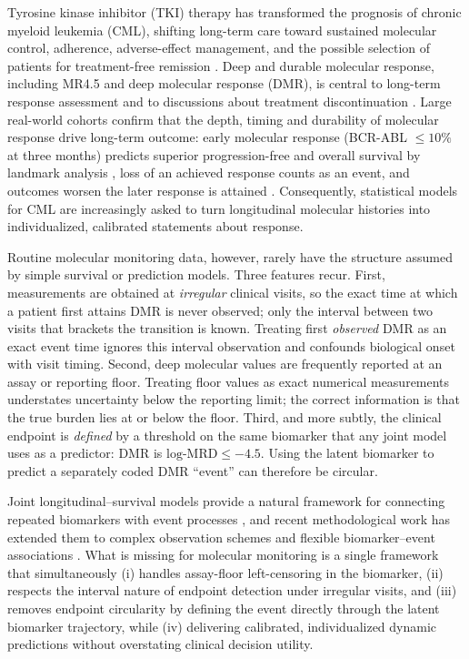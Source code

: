 \documentclass[11pt]{article}
\begin{document}
Tyrosine kinase inhibitor (TKI) therapy has transformed the prognosis of
chronic myeloid leukemia (CML), shifting long-term care toward sustained
molecular control, adherence, adverse-effect management, and the possible
selection of patients for treatment-free remission
\cite{Hochhaus2020ELN,Jabbour2025JAMAReview,Haddad2026Algorithms,Senapati2023CMLManagement}.
Deep and durable molecular response, including MR4.5 and deep molecular
response (DMR), is central to long-term response assessment and to
discussions about treatment discontinuation
\cite{Hughes2014EarlyMolecularResponse,Rasekh2026TFRPredictor,Ono2026MR45,Takahashi2026JSKI}.
Large real-world cohorts confirm that the depth, timing and durability of
molecular response drive long-term outcome: early molecular response
(BCR-ABL $\le 10\%$ at three months) predicts superior progression-free and
overall survival by landmark analysis
\cite{Hanfstein2012EMR,Ohm2012Landmark}, loss of an achieved response counts
as an event, and outcomes worsen the later response is attained
\cite{Li2014TKIEfficacy}.
Consequently, statistical models for CML are increasingly asked to turn
longitudinal molecular histories into individualized, calibrated
statements about response.

Routine molecular monitoring data, however, rarely have the structure
assumed by simple survival or prediction models. Three features recur.
First, measurements are obtained at \emph{irregular} clinical visits, so
the exact time at which a patient first attains DMR is never observed;
only the interval between two visits that brackets the transition is
known. Treating first \emph{observed} DMR as an exact event time ignores
this interval observation and confounds biological onset with visit
timing. Second, deep molecular values are frequently reported at an assay
or reporting floor. Treating floor values as exact numerical measurements
understates uncertainty below the reporting limit; the correct
information is that the true burden lies at or below the floor. Third, and
more subtly, the clinical endpoint is \emph{defined} by a threshold on the
same biomarker that any joint model uses as a predictor: DMR is
$\text{log-MRD} \le -4.5$. Using the latent biomarker to predict a
separately coded DMR ``event'' can therefore be circular.

Joint longitudinal--survival models provide a natural framework for
connecting repeated biomarkers with event processes
\cite{Wulfsohn1997JointModel,Rizopoulos2016JMbayes}, and recent
methodological work has extended them to complex observation schemes and
flexible biomarker--event associations
\cite{Lovblom2026MixedObservationJointModel,Niu2026QuantileJointModel}.
What is missing for molecular monitoring is a single framework that
simultaneously (i) handles assay-floor left-censoring in the biomarker,
(ii) respects the interval nature of endpoint detection under irregular
visits, and (iii) removes endpoint circularity by defining the event
directly through the latent biomarker trajectory, while (iv) delivering
calibrated, individualized dynamic predictions without overstating
clinical decision utility.
\end{document}
